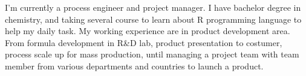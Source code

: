 %
%
%
\par{
I’m currently a process engineer and project manager. I have bachelor degree in chemistry, and taking several course to learn about R programming language to help my daily task. My working experience are in product development area. From formula development in R\&D lab, product presentation to costumer,  process scale up for mass production, until managing a project team with team member from various departments and countries to launch a product.
}